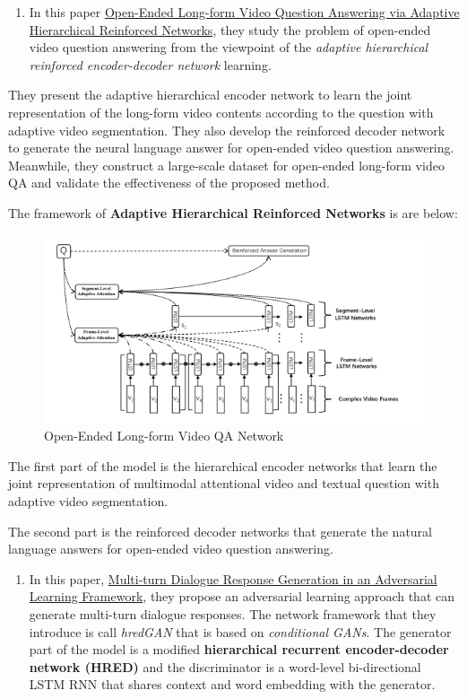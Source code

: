 \documentclass{acm_proc_article-sp}
\providecommand{\tightlist}{%
  \setlength{\itemsep}{0pt}\setlength{\parskip}{0pt}}
\begin{document}
\begin{enumerate}
\def\labelenumi{\arabic{enumi}.}
\setcounter{enumi}{1}
\tightlist
\item
  In this paper
  \href{https://www.ijcai.org/proceedings/2018/0512.pdf}{Open-Ended
  Long-form Video Question Answering via Adaptive Hierarchical
  Reinforced Networks}, they study the problem of open-ended video
  question answering from the viewpoint of the \emph{adaptive
  hierarchical reinforced encoder-decoder network} learning.
\end{enumerate}

They present the adaptive hierarchical encoder network to learn the
joint representation of the long-form video contents according to the
question with adaptive video segmentation. They also develop the
reinforced decoder network to generate the neural language answer for
open-ended video question answering. Meanwhile, they construct a
large-scale dataset for open-ended long-form video QA and validate the
effectiveness of the proposed method.

The framework of \textbf{Adaptive Hierarchical Reinforced Networks} is
are below:

\begin{figure}
\centering
\includegraphics{img/oe.png}
\caption{Open-Ended Long-form Video QA Network}
\end{figure}

The first part of the model is the hierarchical encoder networks that
learn the joint representation of multimodal attentional video and
textual question with adaptive video segmentation.

The second part is the reinforced decoder networks that generate the
natural language answers for open-ended video question answering.

\begin{enumerate}
\def\labelenumi{\arabic{enumi}.}
\setcounter{enumi}{2}
\tightlist
\item
  In this paper, \href{https://arxiv.org/pdf/1805.11752.pdf}{Multi-turn
  Dialogue Response Generation in an Adversarial Learning Framework},
  they propose an adversarial learning approach that can generate
  multi-turn dialogue responses. The network framework that they
  introduce is call \emph{hredGAN} that is based on \emph{conditional
  GANs}. The generator part of the model is a modified
  \textbf{hierarchical recurrent encoder-decoder network (HRED)} and the
  discriminator is a word-level bi-directional LSTM RNN that shares
  context and word embedding with the generator.
\end{enumerate}
\end{document}
